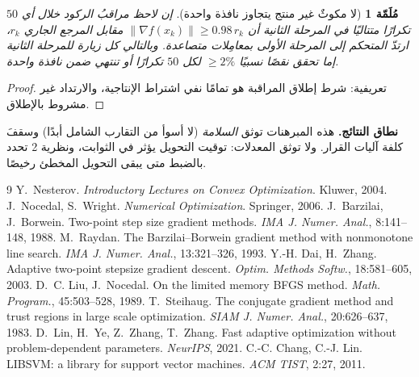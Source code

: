 ﻿\documentclass[12pt]{article}
\newtheorem{lemma}{مُلَمّة}
\begin{document}
\begin{lemma}[لا مكوثٌ غير منتج يتجاوز نافذة واحدة]
إن لاحظ مراقبُ الركود خلال أي $50$ تكرارًا متتاليًا في المرحلة الثانية
أن $\|\nabla f(x_k)\| \ge 0.98\, r_k$ مقابل المرجع الجاري $r_k$، ارتدّ
المتحكم إلى المرحلة الأولى بمعامِلات متصاعدة. وبالتالي كل زيارة
للمرحلة الثانية إما تحقق نقصًا نسبيًا ${\ge}2\%$ لكل $50$ تكرارًا أو
تنتهي ضمن نافذة واحدة.
\end{lemma}
\begin{proof}
تعريفية: شرط إطلاق المراقبة هو تمامًا نفي اشتراط الإنتاجية، والارتداد
غير مشروط بالإطلاق.
\end{proof}

\textbf{نطاق النتائج.} هذه المبرهنات توثق \emph{السلامة} (لا أسوأ من
التقارب الشامل أبدًا) وسقفَ كلفة آليات القرار. ولا توثق المعدلات:
توقيت التحويل يؤثر في الثوابت، ونظرية 2 تحدد بالضبط متى يبقى التحويل
المخطئ رخيصًا.

\begin{thebibliography}{9}\small
{} Y.~Nesterov. \emph{Introductory Lectures on Convex
Optimization}. Kluwer, 2004.
 J.~Nocedal, S.~Wright. \emph{Numerical Optimization}.
Springer, 2006.
 J.~Barzilai, J.~Borwein. Two-point step size gradient
methods. \emph{IMA J. Numer. Anal.}, 8:141--148, 1988.
 M.~Raydan. The Barzilai--Borwein gradient method with
nonmonotone line search. \emph{IMA J. Numer. Anal.}, 13:321--326, 1993.
 Y.-H. Dai, H.~Zhang. Adaptive two-point stepsize
gradient descent. \emph{Optim. Methods Softw.}, 18:581--605, 2003.
 D.~C. Liu, J.~Nocedal. On the limited memory BFGS
method. \emph{Math. Program.}, 45:503--528, 1989.
 T.~Steihaug. The conjugate gradient method and
trust regions in large scale optimization. \emph{SIAM J. Numer. Anal.},
20:626--637, 1983.
 D.~Lin, H.~Ye, Z.~Zhang, T.~Zhang. Fast adaptive
optimization without problem-dependent parameters. \emph{NeurIPS}, 2021.
 C.-C. Chang, C.-J. Lin. LIBSVM: a library for support
vector machines. \emph{ACM TIST}, 2:27, 2011.
\end{thebibliography}
\end{document}
